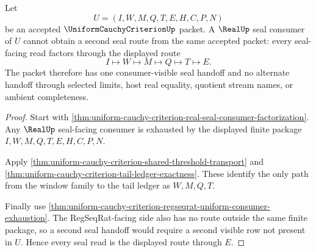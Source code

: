 \begin{theorem}
\label{thm:uniform-cauchy-criterion-seal-route-uniqueness}
Let
$$
U=(I,W,M,Q,T,E,H,C,P,N)
$$
be an accepted $\UniformCauchyCriterionUp$ packet. A $\RealUp$ seal consumer of $U$ cannot obtain a second seal route from the same accepted packet: every seal-facing read factors through the displayed route
$$
I \longmapsto W \longmapsto M \longmapsto Q \longmapsto T \longmapsto E.
$$
The packet therefore has one consumer-visible seal handoff and no alternate handoff through selected limits, host real equality, quotient stream names, or ambient completeness.
\end{theorem}
\begin{proof}
Start with \autoref{thm:uniform-cauchy-criterion-real-seal-consumer-factorization}. Any $\RealUp$ seal-facing consumer is exhausted by the displayed finite package $I,W,M,Q,T,E,H,C,P,N$.

Apply \autoref{thm:uniform-cauchy-criterion-shared-threshold-transport} and \autoref{thm:uniform-cauchy-criterion-tail-ledger-exactness}. These identify the only path from the window family to the tail ledger as $W,M,Q,T$.

Finally use \autoref{thm:uniform-cauchy-criterion-regseqrat-uniform-consumer-exhaustion}. The RegSeqRat-facing side also has no route outside the same finite package, so a second seal handoff would require a second visible row not present in $U$. Hence every seal read is the displayed route through $E$.
\end{proof}

